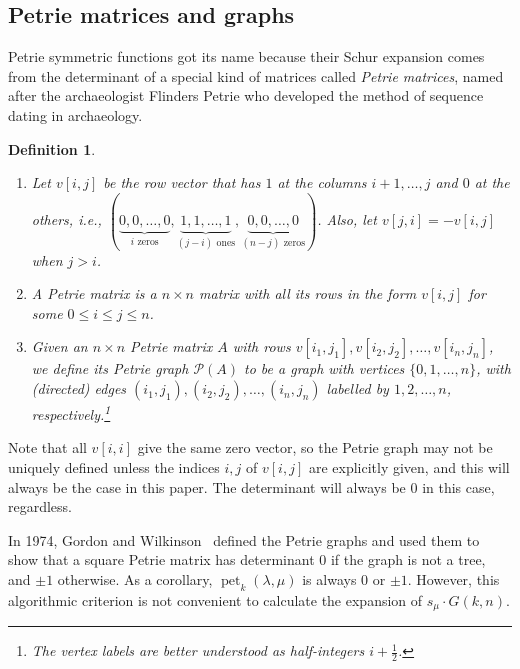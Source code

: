 \documentclass[pdflatex,sn-mathphys-num]{sn-jnl}%
\theoremstyle{thmstyleone}%
\theoremstyle{thmstyletwo}%
\theoremstyle{thmstylethree}%
\newtheorem{definition}[theorem]{Definition}
\numberwithin{equation}{section}
\DeclareMathOperator{\pet}{pet}
\begin{document}

\subsection{Petrie matrices and graphs}

Petrie symmetric functions got its name because their Schur expansion comes from the determinant of a special kind of matrices called \textit{Petrie matrices}, named after the archaeologist Flinders Petrie who developed the method of sequence dating in archaeology.

	\begin{definition}\mbox{}
		\begin{enumerate}
			\item Let $v[i,j]$ be the row vector that has $1$ at the columns $i+1,\dotsc,j$ and $0$ at the others, i.e., $(\underbrace{0,0,\dotsc,0}_{i \text{ zeros}},\underbrace{1,1,\dotsc,1}_{(j-i)\text{ ones}},\underbrace{0,0,\dotsc,0}_{(n-j)\text{ zeros}})$. Also, let $v[j,i]=-v[i,j]$ when $j>i$. 
			\item A \emph{Petrie matrix} is a $n\times n$ matrix with all its rows in the form $v[i,j]$ for some $0\leq i\leq j\leq n$.
			\item Given an $n\times n$ Petrie matrix $A$ with rows $v[i_1,j_1],v[i_2,j_2],\dotsc,v[i_n,j_n]$, we define its \emph{Petrie graph} $\mathcal{P}(A)$ to be a graph with vertices $\{0,1,\dots,n\}$, with (directed) edges $(i_1,j_1),(i_2,j_2),\dotsc,(i_n,j_n)$ labelled by $1,2,\dotsc,n$, respectively.\footnote{The vertex labels are better understood as half-integers $i+\frac 12$.}
		\end{enumerate}
	\end{definition}
	Note that all $v[i,i]$ give the same zero vector, so the Petrie graph may not be uniquely defined unless the indices $i,j$ of $v[i,j]$ are explicitly given, and this will always be the case in this paper. The determinant will always be $0$ in this case, regardless. 

    In 1974, Gordon and Wilkinson~\cite{Gordon1974DeterminantsOP} defined the Petrie graphs and used them to show that a square Petrie matrix has determinant $0$ if the graph is not a tree, and $\pm 1$ otherwise. As a corollary, $\pet_k(\lambda, \mu)$ is always $0$ or $\pm 1$. However, this algorithmic criterion is not convenient to calculate the expansion of $s_\mu\cdot G(k,n)$. 
\end{document}

